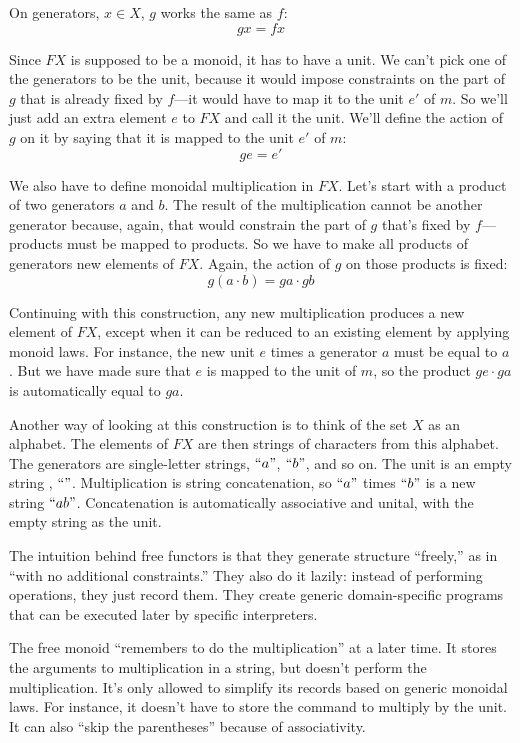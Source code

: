 \documentclass[DaoFP]{subfiles}
\begin{document}
On generators, $x \in X$, $g$ works the same as $f$:
\[ g x = f x \]

Since $F X$ is supposed to be a monoid, it has to have a unit. We can't pick one of the generators to be the unit, because it would impose constraints on the part of $g$ that is already fixed by $f$---it would have to map it to the unit $e'$ of $m$. So we'll just add an extra element $e$ to $F X$ and call it the unit. We'll define the action of $g$ on it by saying that it is mapped to the unit $e'$ of $m$:
\[ g e = e' \]

We also have to define monoidal multiplication in $F X$. Let's start with a product of two generators $a$ and $b$. The result of the multiplication cannot be another generator because, again, that would constrain the part of $g$ that's fixed by $f$---products must be mapped to products. So we have to make all products of generators new elements of $F X$. Again, the action of $g$ on those products is fixed:
\[ g (a \cdot b)  = g a \cdot g b\]

Continuing with this construction, any new multiplication produces a new element of $F X$, except when it can be reduced to an existing element by applying monoid laws. For instance, the new unit $e$ times a generator $a$ must be equal to $a$. But we have made sure that $e$ is mapped to the unit of $m$, so the product $g e \cdot g a$ is automatically equal to $g a$.

Another way of looking at this construction is to think of the set $X$ as an alphabet. The elements of $F X$ are then strings of characters from this alphabet. The generators are single-letter strings, $``a"$, $``b"$, and so on. The unit is an empty string , $``"$. Multiplication is string concatenation, so  $``a"$ times $``b"$ is a new string  $``ab"$. Concatenation is automatically associative and unital, with the empty string as the unit.

The intuition behind free functors is that they generate structure ``freely,'' as in ``with no additional constraints.'' They also do it lazily: instead of performing operations, they just record them. They create generic domain-specific programs that can be executed later by specific interpreters.

The free monoid ``remembers to do the multiplication'' at a later time. It stores the arguments to multiplication in a string, but doesn't perform the multiplication. It's only allowed to simplify its records based on generic monoidal laws. For instance, it doesn't have to store the command to multiply by the unit. It can also ``skip the parentheses'' because of associativity. 
\end{document}

